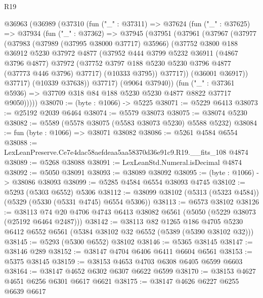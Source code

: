 \begin{lexlean}{R19}
\begin{coremodule}
  @36963
    (@36989
      (@37310
        (fun ("_" : @37311) =>
        @37624
          (fun ("_" : @37625) =>
          @37934
            (fun ("_" : @37362) =>
            @37945
              (@37951
                (@37961
                  (@37967
                    (@37977
                      (@37983
                        (@37989 (@37995 @38000 @37717) @35966)
                        (@37752
                          @3800
                          @188
                          @36912
                          @5230
                          @37972
                          @4877
                          (@37952
                            @444
                            @3799
                            @5232
                            @36911
                            (@4867 @3796 @4877)
                            @37972
                            (@37752 @3797 @188 @5230 @5230 @3796 @4877 (@37773 @446 @3796) @37717)
                            (@10333 @3795))
                          @37717))
                      (@36001 @36917))
                    @37717)
                  (@10339 @37638))
                @37717)
              (@9064 @37940))
            (fun ("_" : @37361 @5936) =>
            @37709 @318 @84 @188 @5230 @5230 @4877 @8822 @37717 @9050)))))
@38070 := (byte : @1066) -> @5225
@38071 := @5229 @6413
@38073 := @25192 @2039 @6464
@38074 := @5579 @38073
@38075 := @38074 @5230
@38082 := @5589 (@5578 @38075 (@5583 @38073 @5230) @5588 @5232)
@38084 := fun (byte : @1066) => @38071 @38082
@38086 := @5261 @4584 @6554
@38088 := LexLeanPreserve.Ce7e4dac58aefdeaa5aa58370d36e91c9.R19.__fits_108 @4874
@38089 := @5268 @38088
@38091 := LexLeanStd.Numeral.isDecimal @4874
@38092 := @5050 @38091
@38093 := @38089 @38092
@38095 := (byte : @1066) -> @38086 @38093
@38099 := @5285 @4584 @6554 @38093 @4745
@38102 := @5293 (@5303 @6552) @5306
@38112 := @38099 @38102 (@5313 (@5323 @4584)) (@5329 (@5330 (@5331 @4745) @6554 @5306))
@38113 := @6573 @38102
@38126 := @38113 @74 @20 @4706 @4743 @6413 @38082 @6561 (@5050 (@5229 @38073 (@25192 @6464 @2487)))
@38142 := @38113
    @82
    @1265
    @186
    @4705
    @5230
    @6412
    @6552
    @6561
    (@5384 @38102 @32 @6552 (@5389 (@5390 @38102 @32)))
@38145 := @5293 (@5300 @6552) @38102
@38146 := @5365 @38145
@38147 := @38146 @289
@38152 := @38147 @4704 @6406 @6411 @6604 @6561
@38153 := @5375 @38145
@38159 := @38153 @4653 @4703 @6308 @6405 @6599 @6603
@38164 := @38147 @4652 @6302 @6307 @6622 @6599
@38170 := @38153 @4627 @4651 @6256 @6301 @6617 @6621
@38175 := @38147 @4626 @6227 @6255 @6639 @6617

\end{coremodule}
\end{lexlean}
